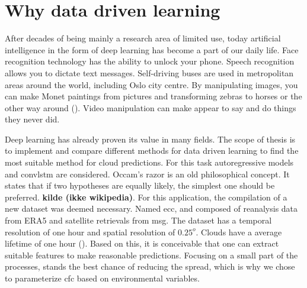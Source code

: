 

\section{Why data driven learning} \label{sec:intro_deep_learning}
After decades of being mainly a research area of limited use, today artificial intelligence in the form of deep learning has become a part of our daily life. Face recognition technology has the ability to unlock your phone. Speech recognition allows you to dictate text messages. Self-driving buses are used in metropolitan areas around the world, including Oslo city centre. By manipulating images, you can make Monet paintings from pictures and transforming zebras to horses or the other way around (\cite{zhu2017_cycleGAN_monet_zebra}). Video manipulation can make appear to say and do things they never did. 

Deep learning has already proven its value in many fields. The scope of thesis is to implement and compare different methods for data driven learning to find the most suitable method for cloud predictions. For this task autoregressive models and \acrfull{convlstm} are considered. 
Occam's razor is an old philosophical concept. It states that if two hypotheses are equally likely, the simplest one should be preferred. \textbf{kilde (ikke wikipedia)}. For this application, the compilation of a new dataset was deemed necessary. Named \acrfull{ecc}, and composed of reanalysis data from ERA5 and satellite retrievals from \acrfull{msg}. The dataset has a temporal resolution of one hour and spatial resolution of $0.25^o$. Clouds have a average lifetime of one hour (\cite{lohmann2016}). Based on this, it is conceivable that one can extract suitable features to make reasonable predictions. Focusing on a small part of the processes, stands the best chance of reducing the spread, which is why we chose to parameterize \acrfull{cfc} based on environmental variables.

